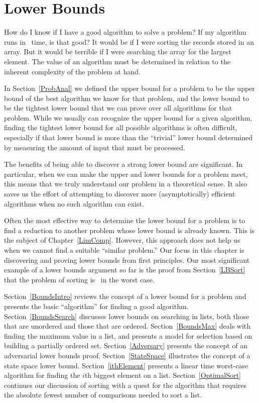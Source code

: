 
\chapter{Lower Bounds}
\label{Bounds}
\def\CHHEAD{Chap.\ \thechapter\ Lower Bounds}    %

How do I know if I have a good algorithm to solve a problem?
If my algorithm runs in \Thetanlogn\ time, is that good?
It would be if I were sorting the records stored in an array.
But it would be terrible if I were searching the array for the largest
element.
The value of an algorithm must be determined in relation to the
inherent complexity of the problem at hand.

In Section~\ref{ProbAnal} we defined the upper bound for
a problem to be the upper bound of the best algorithm we know for that
problem, and the lower bound to be the tightest lower bound that we
can prove over all algorithms for that problem.
While we usually can recognize the upper bound for a given algorithm,
finding the tightest lower bound for all possible algorithms is often
difficult, especially if that lower bound is more than the
``trivial'' lower bound determined by measuring the amount
of input that must be processed.

The benefits of being able to discover a strong lower bound are
significant.
In particular, when we can make the upper and lower bounds for a
problem meet, this means that we truly understand our problem in a
theoretical sense.
It also saves us the effort of attempting to discover more
(asymptotically) efficient algorithms when no such algorithm can
exist.

Often the most effective way to determine the lower bound for a
problem is to find a reduction to another problem whose lower bound is
already known.
This is the subject of Chapter~\ref{LimComp}.
However, this approach does not help us when we cannot find a suitable
``similar problem.''
Our focus in this chapter is discovering and proving lower bounds
from first principles.
Our most  significant example of a lower bounds argument so far is the
proof from Section~\ref{LBSort} that the problem of sorting is
\Onlogn\ in the worst case.

Section~\ref{BoundsIntro} reviews the concept of a lower bound for a
problem and presents the basic ``algorithm'' for finding a good
algorithm. 
Section~\ref{BoundsSearch} discusses lower bounds on searching in
lists, both those that are unordered and those that are ordered.
Section~\ref{BoundsMax} deals with finding the maximum value in a list,
and presents a model for selection based on building a partially
ordered set.
Section~\ref{Adversary} presents the concept of an adversarial lower
bounds proof.
Section~\ref{StateSpace} illustrates the concept of a state space
lower bound.
Section~\ref{ithElement} presents a linear time worst-case algorithm
for finding the \(i\)th biggest element on a list.
Section~\ref{OptimalSort} continues our discussion of sorting with a
quest for the algorithm that requires the absolute fewest number of
comparisons needed to sort a list.

